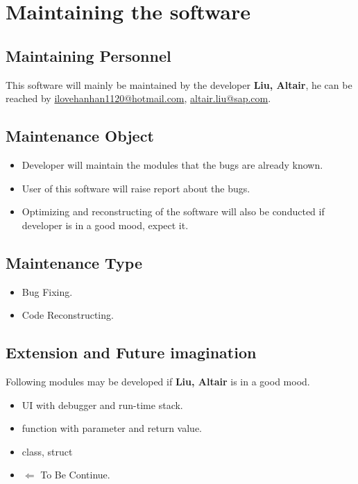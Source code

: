 \documentclass{article}
\begin{document}
		\section{Maintaining the software}
		\subsection{Maintaining Personnel}
		This software will mainly be maintained by the developer \textbf{Liu, Altair}, he can be reached by \url{ilovehanhan1120@hotmail.com}, \url{altair.liu@sap.com}.
		\subsection{Maintenance Object}
		\begin{itemize}
		\item Developer will maintain the modules that the bugs are already known.
		\item User of this software will raise report about the bugs.
		\item Optimizing and reconstructing of the software will also be conducted if developer is in a good mood, expect it.
		\end{itemize}
		\subsection{Maintenance Type}
		\begin{itemize}
		\item Bug Fixing.
		\item Code Reconstructing.
		\end{itemize}
		\subsection{Extension and Future imagination}
		Following modules may be developed if \textbf{Liu, Altair} is in a good mood.
		\begin{itemize}
		\item UI with debugger and run-time stack.
		\item function with parameter and return value.
		\item class, struct
		\item $ \Leftarrow $ To Be Continue.
		\end{itemize}
		
		
	
\end{document}
